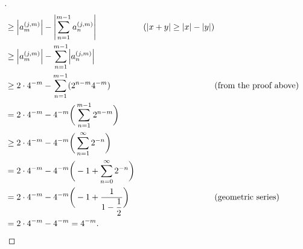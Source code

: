 \begin{proof}[]
\begin{align*}
     & \geq \abs{a_m^{(j, m)}} - \abs{\sum_{n = 1}^{m - 1} a_n^{(j, m)}}                               & (\abs{x + y} \geq \abs{x} - \abs{y})                                 \\
     & \geq \abs{a_m^{(j, m)}} - \sum_{n = 1}^{m - 1} \abs{a_n^{(j, m)}}                                                                                                      \\
     & \geq 2 \cdot 4^{-m} - \sum_{n = 1}^{m - 1} (2^{n - m} 4^{-m})                                   &                                      & \text{(from the proof above)} \\
     & = 2 \cdot 4^{-m} - 4^{-m} \bigg(\sum_{n = 1}^{m - 1} 2^{n - m}\bigg)                                                                                                   \\
     & \geq 2 \cdot 4^{-m} - 4^{-m} \bigg(\sum_{n = 1}^\infty 2^{-n}\bigg)                                                                                                    \\
     & = 2 \cdot 4^{-m} - 4^{-m} \bigg(-1 + \sum_{n = 0}^\infty 2^{-n}\bigg)                                                                                                  \\
     & = 2 \cdot 4^{-m} - 4^{-m} \bigg(-1 + \dfrac{1}{1 - \dfrac{1}{2}}\bigg)                          &                                      & \text{(geometric series)}     \\
     & = 2 \cdot 4^{-m} - 4^{-m} = 4^{-m}.
  \end{align*}
\end{proof}

